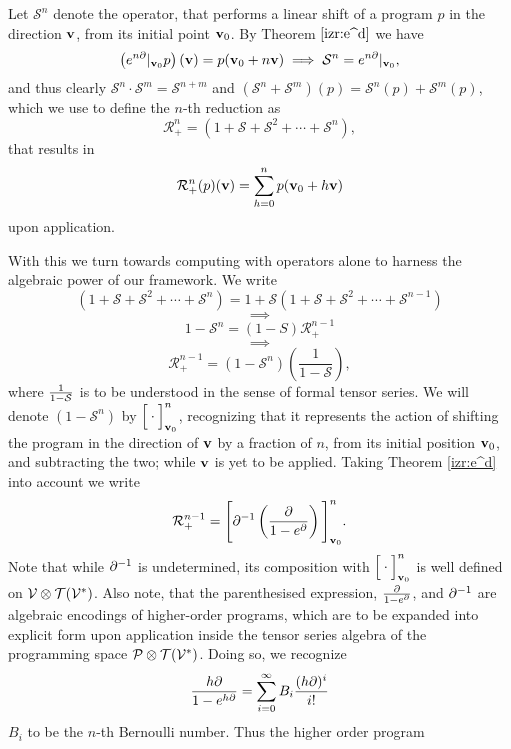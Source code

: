 Let $\mathcal{S}^n$ denote the operator, that performs a linear shift of a program $p$ in the direction $\mathbf{v}$, from its initial point $\mathbf{v}_0$. By Theorem $\ref{izr:e^d}$ we have
  \begin{equation}\label{eq:sn=ed}
    \left(e^{n\partial}\vert_{\mathbf{v}_0}p\right)(\mathbf{v})=p(\mathbf{v}_0+n\mathbf{v})\implies \mathcal{S}^n=e^{n\partial}\vert_{\mathbf{v}_0},
  \end{equation}
and thus clearly $\mathcal{S}^n\cdot\mathcal{S}^m=\mathcal{S}^{n+m}$ and $(\mathcal{S}^n+\mathcal{S}^m)(p)=\mathcal{S}^n(p)+\mathcal{S}^m(p)$, which we use to define the $n$-th reduction as
$$\mathcal{R}_+^n=(1+\mathcal{S}+\mathcal{S}^2+\cdots+\mathcal{S}^n),$$
that results in
   $$\mathcal{R}^n_+(p)(\mathbf{v})=\sum\limits_{h=0}^{n}p(\mathbf{v}_0+h\mathbf{v})$$
upon application.

With this we turn towards computing with operators alone to harness the algebraic power of our framework. We write
$$(1+\mathcal{S}+\mathcal{S}^2+\cdots+\mathcal{S}^n)=1+\mathcal{S}(1+\mathcal{S}+\mathcal{S}^2+\cdots+\mathcal{S}^{n-1})$$
   $$\implies$$
   $$1-\mathcal{S}^n=\left(1-S\right)\mathcal{R}^{n-1}_+$$
   $$\implies$$
  \begin{equation}
\mathcal{R}^{n-1}_+=\left(1-\mathcal{S}^n\right)\left(\frac{1}{1-\mathcal{S}}\right),
  \end{equation}
where $\frac{1}{1-\mathcal{S}}$ is to be understood in the sense of formal tensor series. We will denote $(1-\mathcal{S}^n)$ by $\Big[\cdot\Big]^n_{\mathbf{v}_0}$, recognizing that it represents the action of shifting the program in the direction of $\mathbf{v}$ by a fraction of $n$, from its initial position $\mathbf{v}_0$, and subtracting the two; while $\mathbf{v}$ is yet to be applied. Taking Theorem \ref{izr:e^d} into account we write
  \begin{equation}\label{eq:Rn+Basic}
    \mathcal{R}^{n-1}_+=\Bigg[\partial^{-1}\left(\frac{\partial}{1-e^\partial}\right)\Bigg]^n_{\mathbf{v}_0}.
  \end{equation}
Note that while $\partial^{-1}$ is undetermined, its composition with $\Big[\cdot\Big]^n_{\mathbf{v}_0}$ is well defined on $\mathcal{V}\otimes\mathcal{T}(\mathcal{V}^*)$.
Also note, that the parenthesised expression, $\frac{\partial}{1-e^\partial}$, and $\partial^{-1}$ are algebraic encodings of higher-order programs, which are to be expanded into explicit form upon application inside the tensor series algebra of the programming space $\mathcal{P}\otimes \mathcal{T}(\mathcal{V}^*)$. Doing so, we recognize
\begin{equation}
    	\frac{h\partial}{1-e^{h\partial}}=\sum\limits_{i=0}^{\infty}B_i\frac{(h\partial)^i}{i!}
    \end{equation}
$B_i$ to be the $n$-th Bernoulli number. Thus the higher order program
